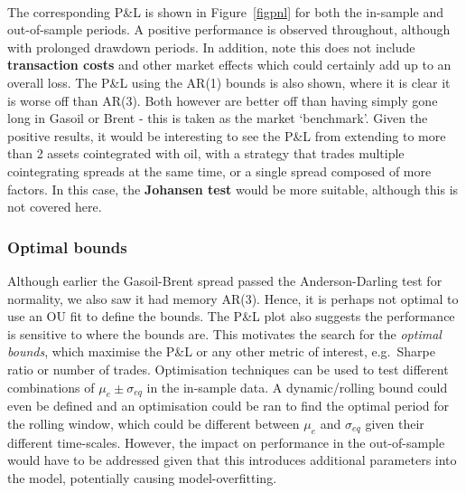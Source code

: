 \documentclass[11pt]{article}
\begin{document}
    \begin{center}
    \end{center}
    { \hspace*{\fill} \\}
 
 
  The corresponding P\&L  is shown in Figure~\ref{figpnl} for both
the in-sample and out-of-sample periods. A positive performance is
observed throughout, although with prolonged drawdown periods. In
addition, note this does not include \textbf{transaction costs} and other market effects which
could certainly add up to an overall loss. The P\&L using the AR(1)
bounds is also shown, where it is clear it is worse off than AR(3). Both
however are better off than having simply gone long in Gasoil or Brent -
this is taken as the market `benchmark'.
Given the positive results, it would be interesting to see the P\&L from
extending to more than 2 assets cointegrated with oil, with a strategy
that trades multiple cointegrating spreads at the same time, or a single
spread composed of more factors. In this case, the \textbf{Johansen
test} would be more suitable, although this is not covered here.


    
    \subsubsection{Optimal bounds}\label{bounds-from-optimisation}
Although earlier the Gasoil-Brent spread passed the Anderson-Darling
test for normality, we also saw it had memory AR(3). Hence, it is
perhaps not optimal to use an OU fit to define the bounds. The P\&L plot also suggests the
performance is sensitive to where the bounds are. This motivates the search
for the \emph{optimal bounds}, which maximise the P\&L or any other
 metric of interest, e.g.~Sharpe ratio or number of trades. Optimisation techniques can
be used to test different combinations of \(\mu_e \pm \sigma_{eq}\) in
the in-sample data. A dynamic/rolling bound could even be defined and  an optimisation
could be ran to find the optimal period for the rolling window,
which could be different between \(\mu_e\) and \(\sigma_{eq}\) given their different time-scales. However, the impact on performance in the out-of-sample would have to be addressed given that this introduces additional parameters into the model, potentially causing model-overfitting.
    
\end{document}
